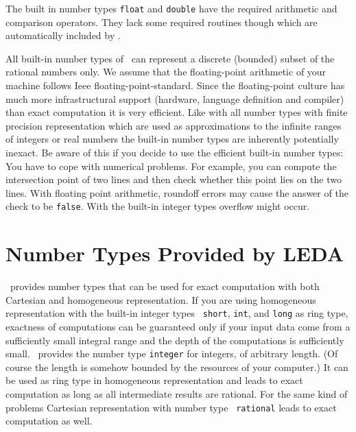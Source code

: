 

The built in number types {\tt float} and {\tt double} have the
required arithmetic and comparison operators. They lack some required
routines though which are automatically included by \cgal.


All built-in number types of \CC\ can represent a discrete (bounded)
subset of the rational numbers only.  We assume that the
floating-point arithmetic of your machine follows {\sc Ieee}
floating-point-standard.  Since the floating-point culture has much
more infrastructural support (hardware, language definition and
compiler) than exact computation it is very efficient.
Like with all number types with finite precision representation
which are used as approximations to the infinite ranges of 
integers or real numbers the built-in number types are inherently
potentially inexact.
Be aware of this if you decide to use the efficient built-in 
number types:
You have to cope with numerical problems.  For example, you can
compute the intersection point of two lines and then check whether
this point lies on the two lines. 
With floating point arithmetic,
roundoff errors may cause the answer of the check to be {\tt false}. 
With the built-in integer types overflow might occur.

\section{Number Types Provided by LEDA}

\leda\ provides number types that can be used for exact computation 
with both Cartesian and homogeneous representation.  If you are using
homogeneous representation with the built-in integer types {\tt
short}, {\tt int}, and {\tt long} as ring type, exactness of
computations can be guaranteed only if your input data come from a
sufficiently small integral range and the depth of the computations is
sufficiently small.  \leda\ provides the number type {\tt integer} for
integers, of arbitrary length. (Of course the length is
somehow bounded by the resources of your computer.)  It can be used as
ring type in homogeneous representation and leads to exact
computation as long as all intermediate results are rational.  For the
same kind of problems Cartesian representation with number type {\tt
rational} leads to exact computation as well.

